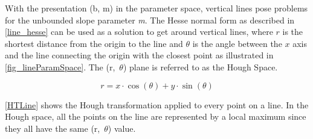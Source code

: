 With the presentation (b, m) in the parameter space, vertical lines pose problems for the unbounded slope parameter \textit{m}. The Hesse normal form as described in \cref{line_hesse} can be used as a solution to get around vertical lines, where $r$ is the shortest distance from the origin to the line and $\theta$ is the angle between the $x$ axis and the line connecting the origin with the closest point as illustrated in \cref{fig_lineParamSpace}. The (r,~$\theta$) plane is referred to as the Hough Space.


\begin{equation}
	r = x \cdot \cos(\theta) + y \cdot \sin(\theta)
	\label{line_hesse}
\end{equation}

\cref{HTLine} shows the Hough transformation applied to every point on a line. In the Hough space, all the points on the line are represented by a local maximum since they all have the same (r,~$\theta$) value.
